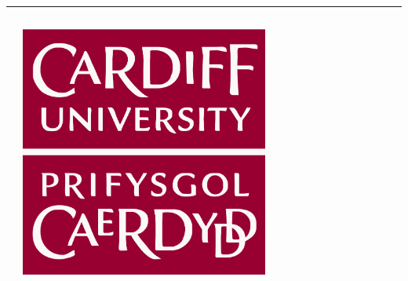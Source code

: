 \documentclass[usenames,dvipsnames,t]{beamer}
\begin{document}
\hrule height 5pt 
\begin{columns}
    \begin{column}{.05\linewidth}
    \end{column}
    \begin{column}{.1\linewidth}
        \vspace{0.7cm}

        \includegraphics[width=0.7\textwidth]{static/cardiff_uni_logo.jpg}
    \end{column}
    \begin{column}{.1\linewidth}
    \end{column}
    \begin{column}{.20\linewidth}
        \vspace{1.4cm}

        \faTwitter \ NikoletaGlyn \\
        \faGithub \ Nikoleta-v3}
    \end{column}
    \begin{column}{.55\linewidth}
        \scriptsize{
        
        }
    \end{column}
\end{columns}
\end{document}
